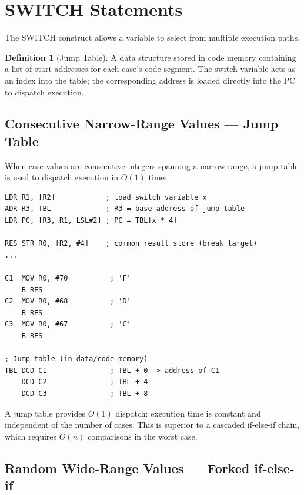 \documentclass[11pt, a4paper, notitlepage]{report}
\theoremstyle{definition}
\newtheorem{definition}[theorem]{Definition}
\theoremstyle{remark}
\theoremstyle{definition}
\begin{document}
\section{SWITCH Statements}

The SWITCH construct allows a variable to select from multiple execution paths.

\begin{definition}[Jump Table]
\label{def:jump-table}
A data structure stored in code memory containing a list of start addresses for each case's code segment. The switch variable acts as an index into the table; the corresponding address is loaded directly into the PC to dispatch execution.
\end{definition}

\subsection{Consecutive Narrow-Range Values --- Jump Table}

When case values are consecutive integers spanning a narrow range, a jump table is used to dispatch execution in $O(1)$ time:

\begin{lstlisting}
LDR R1, [R2]            ; load switch variable x
ADR R3, TBL             ; R3 = base address of jump table
LDR PC, [R3, R1, LSL#2] ; PC = TBL[x * 4]

RES STR R0, [R2, #4]    ; common result store (break target)
...

C1  MOV R0, #70          ; 'F'
    B RES
C2  MOV R0, #68          ; 'D'
    B RES
C3  MOV R0, #67          ; 'C'
    B RES

; Jump table (in data/code memory)
TBL DCD C1               ; TBL + 0 -> address of C1
    DCD C2               ; TBL + 4
    DCD C3               ; TBL + 8
\end{lstlisting}

\begin{keyresult}[title={Jump Table Properties}]
A jump table provides $O(1)$ dispatch: execution time is constant and independent of the number of cases. This is superior to a cascaded if-else-if chain, which requires $O(n)$ comparisons in the worst case.
\end{keyresult}

\subsection{Random Wide-Range Values --- Forked if-else-if}
\end{document}

